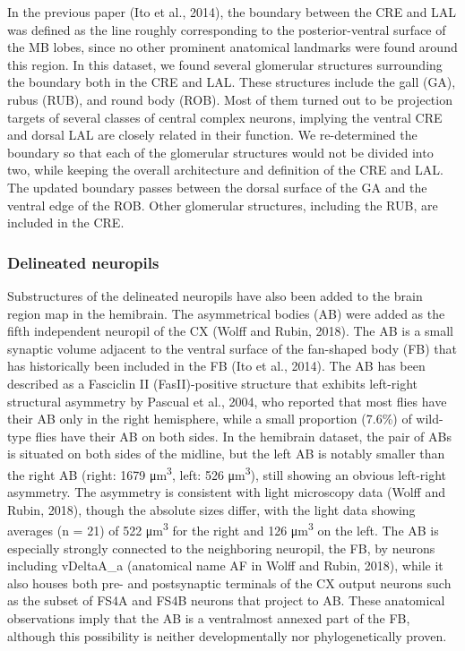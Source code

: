 \documentclass{article}
\begin{document}
In the previous paper (Ito et al., 2014), the boundary between the CRE and LAL was defined as the line roughly corresponding to the posterior-ventral surface of the MB lobes, since no other prominent anatomical landmarks were found around this region. In this dataset, we found several glomerular structures surrounding the boundary both in the CRE and LAL. These structures include the gall (GA), rubus (RUB), and round body (ROB). Most of them turned out to be projection targets of several classes of central complex neurons, implying the ventral CRE and dorsal LAL are closely related in their function. We re-determined the boundary so that each of the glomerular structures would not be divided into two, while keeping the overall architecture and definition of the CRE and LAL. The updated boundary passes between the dorsal surface of the GA and the ventral edge of the ROB. Other glomerular structures, including the RUB, are included in the CRE.

\subsubsection*{Delineated neuropils}

Substructures of the delineated neuropils have also been added to the brain region map in the hemibrain. The asymmetrical bodies (AB) were added as the fifth independent neuropil of the CX (Wolff and Rubin, 2018). The AB is a small synaptic volume adjacent to the ventral surface of the fan-shaped body (FB) that has historically been included in the FB (Ito et al., 2014). The AB has been described as a Fasciclin II (FasII)-positive structure that exhibits left-right structural asymmetry by Pascual et al., 2004, who reported that most flies have their AB only in the right hemisphere, while a small proportion (7.6\%) of wild-type flies have their AB on both sides. In the hemibrain dataset, the pair of ABs is situated on both sides of the midline, but the left AB is notably smaller than the right AB (right: 1679 μm\textsuperscript{3}, left: 526 μm\textsuperscript{3}), still showing an obvious left-right asymmetry. The asymmetry is consistent with light microscopy data (Wolff and Rubin, 2018), though the absolute sizes differ, with the light data showing averages (n = 21) of 522 μm\textsuperscript{3} for the right and 126 μm\textsuperscript{3} on the left. The AB is especially strongly connected to the neighboring neuropil, the FB, by neurons including vDeltaA\_a (anatomical name AF in Wolff and Rubin, 2018), while it also houses both pre- and postsynaptic terminals of the CX output neurons such as the subset of FS4A and FS4B neurons that project to AB. These anatomical observations imply that the AB is a ventralmost annexed part of the FB, although this possibility is neither developmentally nor phylogenetically proven.
\end{document}
